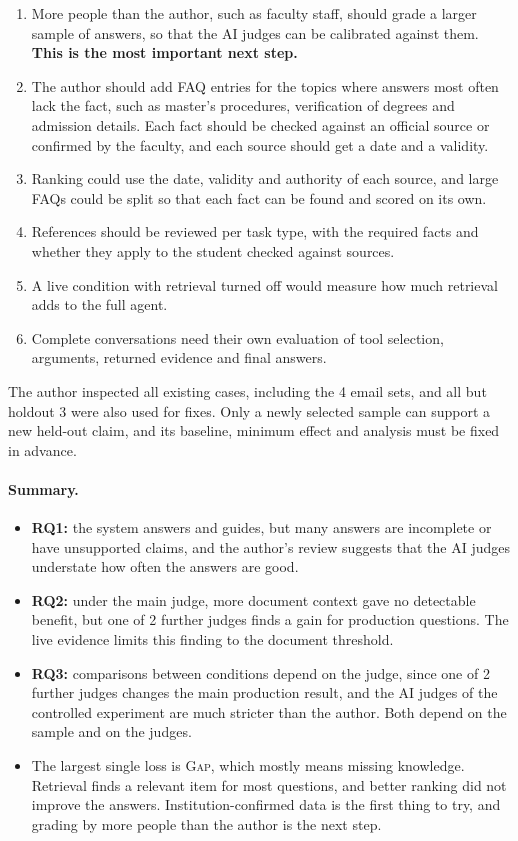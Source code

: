 \begin{enumerate}
  \item More people than the author, such as faculty staff, should grade a larger sample of answers, so that the AI judges can be calibrated against them. \textbf{This is the most important next step.}
  \item The author should add FAQ entries for the topics where answers most often lack the fact, such as master's procedures, verification of degrees and admission details. Each fact should be checked against an official source or confirmed by the faculty, and each source should get a date and a validity.
  \item Ranking could use the date, validity and authority of each source, and large FAQs could be split so that each fact can be found and scored on its own.
  \item References should be reviewed per task type, with the required facts and whether they apply to the student checked against sources.
  \item A live condition with retrieval turned off would measure how much retrieval adds to the full agent.
  \item Complete conversations need their own evaluation of tool selection, arguments, returned evidence and final answers.
\end{enumerate}
The author inspected all existing cases, including the 4 email sets, and all but holdout 3 were also used for fixes. Only a newly selected sample can support a new held-out claim, and its baseline, minimum effect and analysis must be fixed in advance.

\paragraph{Summary.}
\begin{itemize}
  \item \textbf{RQ1:} the system answers and guides, but many answers are incomplete or have unsupported claims, and the author's review suggests that the AI judges understate how often the answers are good.
  \item \textbf{RQ2:} under the main judge, more document context gave no detectable benefit, but one of 2 further judges finds a gain for production questions. The live evidence limits this finding to the document threshold.
  \item \textbf{RQ3:} comparisons between conditions depend on the judge, since one of 2 further judges changes the main production result, and the AI judges of the controlled experiment are much stricter than the author. Both depend on the sample and on the judges.
  \item The largest single loss is \textsc{Gap}, which mostly means missing knowledge. Retrieval finds a relevant item for most questions, and better ranking did not improve the answers. Institution-confirmed data is the first thing to try, and grading by more people than the author is the next step.
\end{itemize}
